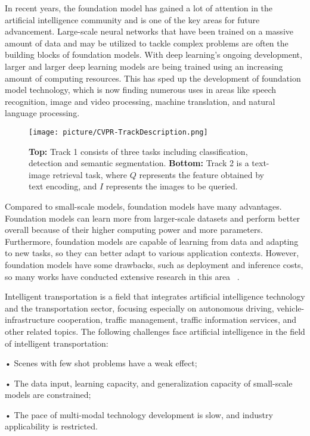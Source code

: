 \documentclass[10pt,twocolumn,letterpaper]{article}
\begin{document}
In recent years, the foundation model has gained a lot of attention in the artificial intelligence community and is one of the key areas for future advancement. Large-scale neural networks that have been trained on a massive amount of data and may be utilized to tackle complex problems are often the building blocks of foundation models. With deep learning's ongoing development, larger and larger deep learning models are being trained using an increasing amount of computing resources. This has sped up the development of foundation model technology, which is now finding numerous uses in areas like speech recognition, image and video processing, machine translation, and natural language processing.

\begin{figure}[t]
  \centering
\texttt{[image: picture/CVPR-TrackDescription.png]}
   \caption{\textbf{Top:} Track 1 consists of  three tasks including classification, detection and semantic segmentation. \textbf{Bottom:} Track 2 is a text-image retrieval  task, where $Q$ represents the feature obtained by text encoding, and $I$ represents the images to be queried.}
   \label{fig:onecol}
\end{figure}

Compared to small-scale models, foundation models have many advantages. Foundation models can learn more from larger-scale datasets and perform better overall because of their higher computing power and more parameters. Furthermore, foundation models are capable of learning from data and adapting to new tasks, so they can better adapt to various application contexts. However, foundation models have some drawbacks, such as deployment and inference costs, so many works have conducted extensive research in this area ~\cite{xi2022ufo,cai2020once,Wang2020HATHT}.

Intelligent transportation is a field that integrates artificial intelligence technology and the transportation sector, focusing especially on autonomous driving, vehicle-infrastructure cooperation, traffic management, traffic information services, and other related topics. The following challenges face artificial intelligence in the field of intelligent transportation:

• Scenes with few shot problems have a weak effect;

• The data input, learning capacity, and generalization capacity of small-scale models are constrained;

• The pace of multi-modal technology development is slow, and industry applicability is restricted.
\end{document}
